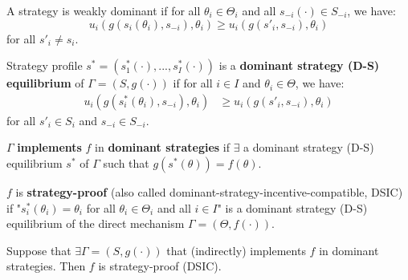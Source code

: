 \documentclass[11pt]{elegantbook}
\begin{document}
\begin{definition}
    \normalfont
    A strategy is weakly dominant if for all $\theta_i\in\Theta_i$ and all $s_{-i}(\cdot)\in S_{-i}$, we have:
    $$u_i(g(s_i(\theta_i),s_{-i}),\theta_i)\geq u_i(g(s'_i,s_{-i}),\theta_i)$$
    for all $s'_i\neq s_i$.
\end{definition}

\begin{definition}
    \normalfont
    Strategy profile $s^*=(s_1^*(\cdot),...,s_I^*(\cdot))$ is a \textbf{dominant strategy (D-S) equilibrium} of $\Gamma=(S,g(\cdot))$ if for all $i\in I$ and $\theta_i\in \Theta$, we have:
    \begin{equation}
        \begin{aligned}
            u_i(g(s_i^*(\theta_i),s_{-i}),\theta_i)&\geq u_i(g(s'_i,s_{-i}),\theta_i)
        \end{aligned}
        \nonumber
    \end{equation}
    for all $s'_i\in S_i$ and $s_{-i}\in S_{-i}$.
\end{definition}

\begin{definition}
    \normalfont
    $\Gamma$ \textbf{implements} $f$ in \textbf{dominant strategies} if $\exists$ a dominant strategy (D-S) equilibrium $s^*$ of $\Gamma$ such that $g(s^*(\theta))=f(\theta)$.
\end{definition}

\begin{definition}
    \normalfont
    $f$ is \textbf{strategy-proof} (also called dominant-strategy-incentive-compatible, DSIC) if "$s^*_i(\theta_i)=\theta_i$ for all $\theta_i\in\Theta_i$ and all $i\in I$" is a dominant strategy (D-S) equilibrium of the direct mechanism $\Gamma=(\Theta,f(\cdot))$.
\end{definition}

\begin{theorem}
    Suppose that $\exists \Gamma=(S,g(\cdot))$ that (indirectly) implements $f$ in dominant strategies. Then $f$ is strategy-proof (DSIC).
\end{theorem}
\end{document}
